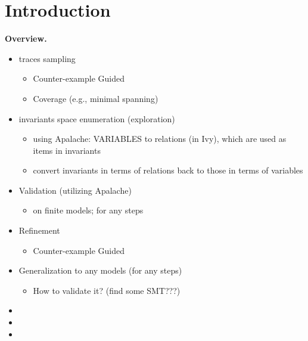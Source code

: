 
\section{Introduction} \label{section:intro}



\bf{Overview.}
\begin{itemize}
 \item \tlaplus traces sampling
   \begin{itemize}
     \item Counter-example Guided
     \item Coverage (e.g., minimal spanning)
   \end{itemize}
 \item invariants space enumeration (exploration)
   \begin{itemize}
     \item using Apalache: VARIABLES to relations (in Ivy),
       which are used as items in invariants
     \item convert invariants in terms of relations back to those in terms of \tlaplus{} variables
   \end{itemize}
 \item Validation (utilizing Apalache)
   \begin{itemize}
     \item on finite models; for any steps
   \end{itemize}
 \item Refinement
   \begin{itemize}
     \item Counter-example Guided
   \end{itemize}
 \item Generalization to any models (for any steps)
   \begin{itemize}
     \item How to validate it? (find some SMT???)
   \end{itemize}
\end{itemize}

\begin{itemize}
  \item 
  \item 
  \item 
\end{itemize}
